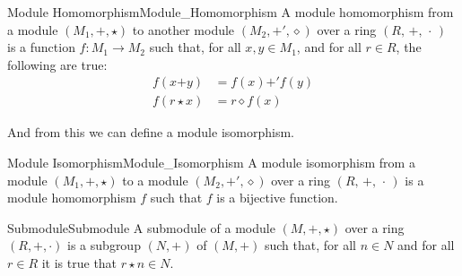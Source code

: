     \begin{fdefinition}{Module Homomorphism}{Module_Homomorphism}
        A \gls{module homomorphism} from a
        \gls{module} $(M_{1},\boldsymbol{+},\star)$ to another module
        $(M_{2},\boldsymbol{+}',\diamond)$ over a \gls{ring}
        $(R,\,+,\,\cdot\,)$ is a \gls{function} $f:M_{1}\rightarrow{M}_{2}$
        such that, for all $x,y\in{M}_{1}$, and for all $r\in{R}$, the
        following are true:
        \begin{align}
            f(x\boldsymbol{+}y)&=f(x)\boldsymbol{+}'f(y)
            \tag{Preservation of Addition}\\
            f(r\star{x})&=r\diamond{f}(x)
            \tag{Preservation of Scalar Multiplication}
        \end{align}
    \end{fdefinition}
    And from this we can define a module isomorphism.
    \begin{fdefinition}{Module Isomorphism}{Module_Isomorphism}
        A \gls{module isomorphism} from a \gls{module}
        $(M_{1},\boldsymbol{+},\star)$ to a module
        $(M_{2},\boldsymbol{+}',\diamond)$ over a \gls{ring}
        $(R,\,+,\,\cdot\,)$ is a \gls{module homomorphism} $f$ such that $f$ is
        a \gls{bijective function}.
    \end{fdefinition}
    \begin{fdefinition}{Submodule}{Submodule}
        A \gls{submodule} of a \gls{module}
        $(M,\boldsymbol{+},\star)$ over a ring $(R,+,\cdot)$ is a \gls{subgroup}
        $(N,\boldsymbol{+})$ of $(M,\boldsymbol{+})$ such that, for all
        $n\in{N}$ and for all $r\in{R}$ it is true that $r\star{n}\in{N}$.
    \end{fdefinition}